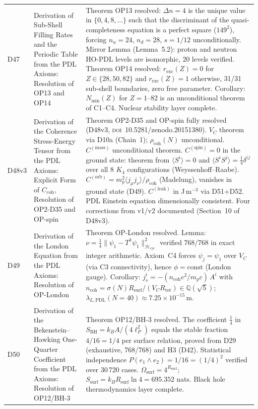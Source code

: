 \documentclass[11pt,a4paper]{article}
\theoremstyle{plain}
\theoremstyle{definition}
\theoremstyle{remark}
\newcommand{\Rsurf}{R_{\mathrm{surf}}}
\newcommand{\Rtot}{R_{\mathrm{tot}}}
\newcommand{\SBH}{S_{\mathrm{BH}}}
\newcommand{\rhocoh}{\rho_{\mathrm{coh}}}
\newcommand{\Ccoh}{C_{\mathrm{coh}}}
\begin{document}
\begin{longtable}{L{1.3cm}L{3.8cm}L{8.0cm}}
D47 & Derivation of Sub-Shell Filling Rates and the Periodic Table from the PDL Axioms: Resolution of OP13 and OP14~\cite{D47} & \textcolor{proofblue}{Theorem} OP13 resolved: $\Delta n=4$ is the unique value in $\{0,4,8,\ldots\}$ such that the discriminant of the quasi-completeness equation is a perfect square ($149^2$), forcing $n_u=24$, $n_d=28$, $s=1/12$ unconditionally. Mirror Lemma (Lemma~5.2): proton and neutron HO-PDL levels are isomorphic, 20 levels verified. \textcolor{proofblue}{Theorem} OP14 resolved: $r_{\mathrm{exc}}(Z)=0$ for $Z\in\{28,50,82\}$ and $r_{\mathrm{exc}}(Z)=1$ otherwise, 31/31 sub-shell boundaries, zero free parameter. Corollary: $N_{\min}(Z)$ for $Z=1$--82 is an unconditional theorem of C1--C4. Nuclear stability layer complete.\\[0.4em]
D48v3 & Derivation of the Coherence Stress-Energy Tensor from the PDL Axioms: Explicit Form of $\Ccoh$, Resolution of OP2-D35 and OP-spin~\cite{D48} & \textcolor{proofblue}{Theorem} OP2-D35 and OP-spin fully resolved (D48v3, \textsc{doi}~10.5281/zenodo.20151380). $V_C$ theorem via D10a (Chain~1); $\rhocoh(N)$ unconditional. $C^{(\mathrm{mass})}$ unconditional theorem. $C^{(\mathrm{spin})}=0$ in the ground state: theorem from $\langle S^i\rangle=0$ and $\langle S^iS^j\rangle=\tfrac{1}{4}\delta^{ij}$ over all 8 $K_4$ configurations (Weyssenhoff--Raabe). $C^{(\mathrm{orb})}=m_p^2\langle j_\mu j_\nu\rangle/\rhocoh$ (Madelung), vanishes in ground state (D49). $C^{(\mathrm{leak})}$ in J\,m$^{-3}$ via D51+D52. PDL Einstein equation dimensionally consistent. Four corrections from v1/v2 documented (Section~10 of D48v3).\\[0.4em]
D49 & Derivation of the London Equation from the PDL Axioms: Resolution of OP-London~\cite{D49} & \textcolor{proofblue}{Theorem} OP-London resolved. Lemma: $\nu = \tfrac{1}{4}\|\psi_1 - T^k\psi_1\|^2_{\mathcal{H}_{\mathrm{cyc}}}$ verified 768/768 in exact integer arithmetic. Axiom~C4 forces $\psi_j = \psi_1$ over $V_C$ (via C3 connectivity), hence $\phi = \mathrm{const}$ (London gauge). Corollary: $j^i_s = -(n_{\mathrm{coh}} e^2 / m_p c)\,A^i$ with $n_{\mathrm{coh}} = \sigma(N)\Rsurf/(V_C\Rtot) \in \mathbb{Q}(\sqrt{5})$; $\lambda_{L,\mathrm{PDL}}(N=40) \approx 7.25 \times 10^{-15}$\,m.\\[0.4em]
D50 & Derivation of the Bekenstein--Hawking One-Quarter Coefficient from the PDL Axioms: Resolution of OP12/BH-3~\cite{D50} & \textcolor{proofblue}{Theorem} OP12/BH-3 resolved. The coefficient $\tfrac{1}{4}$ in $\SBH = k_B A/(4\ell_P^2)$ equals the stable fraction $4/16 = 1/4$ per surface relation, proved from D29 (exhaustive, 768/768) and H3 (D42). Statistical independence $P(e_1\wedge e_2) = 1/16 = (1/4)^2$ verified over 30\,720 cases. $\Omega_{\mathrm{surf}} = 4^{\Rsurf}$; $S_{\mathrm{surf}} = k_B\Rsurf\ln 4 = 695.352$ nats. Black hole thermodynamics layer complete.\\[0.4em]

\end{longtable}
\end{document}
